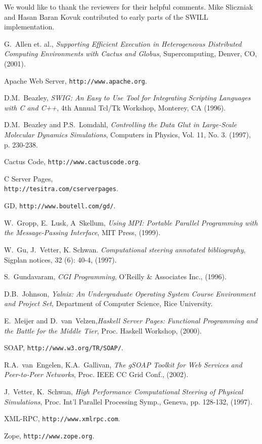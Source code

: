 We would like to thank the reviewers for their helpful comments.   Mike Sliczniak and Hasan Baran Kovuk
contributed to early parts of the SWILL implementation.   

\begin{thebibliography}{99}

 G.~Allen et. al., {\em Supporting Efficient Execution in Heterogeneous Distributed Computing Environments with Cactus and Globus}, Supercomputing, Denver, CO, (2001).

 Apache Web Server, {\tt http://www.apache.org}.

 D.M.~Beazley, {\em SWIG: An Easy to Use Tool for Integrating Scripting Languages with C and C++}, 4th Annual Tcl/Tk Workshop, Monterey, CA (1996).

 D.M.~Beazley and P.S.~Lomdahl, {\em Controlling the Data Glut in Large-Scale Molecular Dynamics Simulations}, Computers in Physics, Vol. 11, No. 3. (1997), p. 230-238. 


 Cactus Code, {\tt http://www.cactuscode.org}.

 C Server Pages,\\
 {\tt  http://tesitra.com/cserverpages}.

 GD, {\tt http://www.boutell.com/gd/}.

 W.~Gropp, E.~Lusk, A~Skellum, {\em Using MPI: Portable Parallel Programming with the Message-Passing Interface}, MIT Press, (1999).

 W.~Gu, J.~Vetter, K. Schwan. {\em Computational steering 
annotated bibliography},  Sigplan notices, 32 (6): 40-4, (1997). 

 S.~Gundavaram, {\em CGI Programming}, O'Reilly \& Associates Inc., (1996).

 D.B.~Johnson, {\em Yalnix: An Undergraduate
Operating System Course Environment and Project Set}, Department of
Computer Science, Rice University.

 E.~Meijer and D.~van~Velzen,{\em Haskell Server Pages: Functional Programming and the Battle for the Middle Tier}, Proc. Haskell Workshop, (2000).

 SOAP, {\tt http://www.w3.org/TR/SOAP/}.

 R.A.~van~Engelen, K.A.~Gallivan, {\em The gSOAP Toolkit for Web Services and Peer-to-Peer Networks}, Proc. IEEE CC Grid Conf., (2002).

 J.~Vetter, K.~Schwan, {\em High Performance Computational 
Steering of Physical Simulations}, Proc. Int'l Parallel Processing Symp., 
Geneva, pp. 128-132, (1997). 

 XML-RPC, {\tt http://www.xmlrpc.com}.

 Zope, {\tt http://www.zope.org}.

\end{thebibliography}


